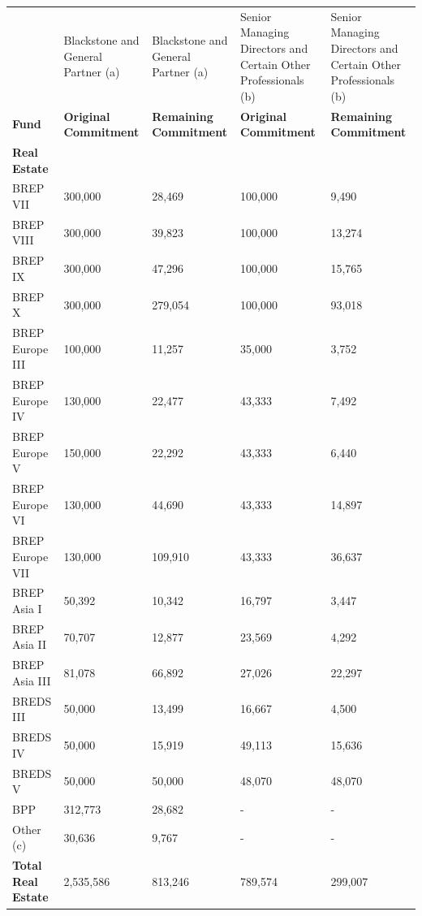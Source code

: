 \begin{table}[h]
    \centering
    \begin{tabular}{|l|l|l|l|l|}
        \hline
        &  Blackstone and General Partner (a) &Blackstone and General Partner (a) &  Senior Managing Directors and Certain Other Professionals (b) & Senior Managing Directors and Certain Other Professionals (b) \\
        \textbf{Fund} & \textbf{Original Commitment} & \textbf{Remaining Commitment} & \textbf{Original Commitment} & \textbf{Remaining Commitment} \\ 
        \hline
        \textbf{Real Estate} &  &  &  &  \\ 
        BREP VII & 300,000 & 28,469 & 100,000 & 9,490 \\ 
        BREP VIII & 300,000 & 39,823 & 100,000 & 13,274 \\ 
        BREP IX & 300,000 & 47,296 & 100,000 & 15,765 \\ 
        BREP X & 300,000 & 279,054 & 100,000 & 93,018 \\ 
        BREP Europe III & 100,000 & 11,257 & 35,000 & 3,752 \\ 
        BREP Europe IV & 130,000 & 22,477 & 43,333 & 7,492 \\ 
        BREP Europe V & 150,000 & 22,292 & 43,333 & 6,440 \\ 
        BREP Europe VI & 130,000 & 44,690 & 43,333 & 14,897 \\ 
        BREP Europe VII & 130,000 & 109,910 & 43,333 & 36,637 \\ 
        BREP Asia I & 50,392 & 10,342 & 16,797 & 3,447 \\ 
        BREP Asia II & 70,707 & 12,877 & 23,569 & 4,292 \\ 
        BREP Asia III & 81,078 & 66,892 & 27,026 & 22,297 \\ 
        BREDS III & 50,000 & 13,499 & 16,667 & 4,500 \\ 
        BREDS IV & 50,000 & 15,919 & 49,113 & 15,636 \\ 
        BREDS V & 50,000 & 50,000 & 48,070 & 48,070 \\ 
        BPP & 312,773 & 28,682 & - & - \\ 
        Other (c) & 30,636 & 9,767 & - & - \\ 
        \hline
        \textbf{Total Real Estate} & 2,535,586 & 813,246 & 789,574 & 299,007 \\ 
        \hline
    \end{tabular}
\end{table}